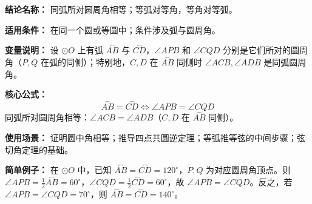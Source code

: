 \textbf{结论名称：} 同弧所对圆周角相等；等弧对等角，等角对等弧。

\textbf{适用条件：} 在同一个圆或等圆中；条件涉及弧与圆周角。

\textbf{变量说明：} 设 $\odot O$ 上有弧 $\overset{\frown}{AB}$ 与 $\overset{\frown}{CD}$，$\angle APB$ 和 $\angle CQD$ 分别是它们所对的圆周角（$P,Q$ 在弧的同侧）；特别地，$C,D$ 在 $\overset{\frown}{AB}$ 同侧时 $\angle ACB,\angle ADB$ 是同弧圆周角。

\textbf{核心公式：}
\[
\boxed{\overset{\frown}{AB} = \overset{\frown}{CD} \iff \angle APB = \angle CQD}
\]
同弧所对圆周角相等：$\angle ACB = \angle ADB$（$C,D$ 在 $\overset{\frown}{AB}$ 同侧）。

\textbf{使用场景：} 证明圆中角相等；推导四点共圆逆定理；等弧推等弦的中间步骤；弦切角定理的基础。

\textbf{简单例子：} 在 $\odot O$ 中，已知 $\overset{\frown}{AB} = \overset{\frown}{CD} = 120^\circ$，$P,Q$ 为对应圆周角顶点。则 $\angle APB = \frac{1}{2} \overset{\frown}{AB} = 60^\circ$，$\angle CQD = \frac{1}{2} \overset{\frown}{CD} = 60^\circ$，故 $\angle APB = \angle CQD$。反之，若 $\angle APB = \angle CQD = 70^\circ$，则 $\overset{\frown}{AB} = \overset{\frown}{CD} = 140^\circ$。